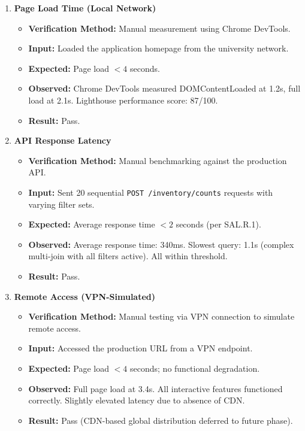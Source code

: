 \documentclass[12pt, titlepage]{article}
\begin{document}
\begin{enumerate}[label=\textbf{FR7-T\arabic*:}, leftmargin=*, labelsep=1em]
\sloppy

  \item \textbf{Page Load Time (Local Network)}
  \begin{itemize}
    \item \textbf{Verification Method:} Manual measurement using Chrome DevTools. 
    \item \textbf{Input:} Loaded the application homepage from the university network.
    \item \textbf{Expected:} Page load $< 4$ seconds.
    \item \textbf{Observed:} Chrome DevTools measured DOMContentLoaded at 1.2s, full load at 2.1s. Lighthouse performance score: 87/100.
    \item \textbf{Result:} Pass.
  \end{itemize}

  \item \textbf{API Response Latency}
  \begin{itemize}
    \item \textbf{Verification Method:} Manual benchmarking against the production API.
    \item \textbf{Input:} Sent 20 sequential \texttt{POST /inventory/counts} requests with varying filter sets.
    \item \textbf{Expected:} Average response time $< 2$ seconds (per SAL.R.1).
    \item \textbf{Observed:} Average response time: 340ms. Slowest query: 1.1s (complex multi-join with all filters active). All within threshold.
    \item \textbf{Result:} Pass.
  \end{itemize}

  \item \textbf{Remote Access (VPN-Simulated)}
  \begin{itemize}
    \item \textbf{Verification Method:} Manual testing via VPN connection to simulate remote access.
    \item \textbf{Input:} Accessed the production URL from a VPN endpoint.
    \item \textbf{Expected:} Page load $< 4$ seconds; no functional degradation.
    \item \textbf{Observed:} Full page load at 3.4s. All interactive features functioned correctly. Slightly elevated latency due to absence of CDN.
    \item \textbf{Result:} Pass (CDN-based global distribution deferred to future phase).
  \end{itemize}


\end{enumerate}
\end{document}

